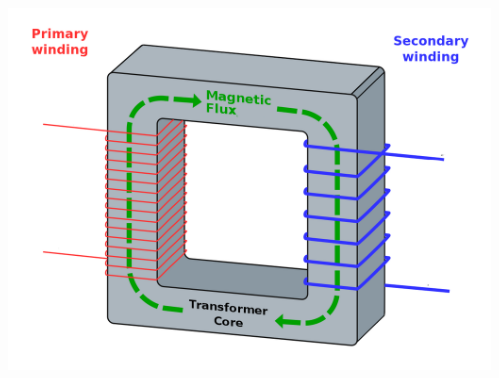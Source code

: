 \documentclass[unknownkeysallowed]{beamer}
\begin{document}
\begin{frame}
\begin{center}
\begin{minipage}{.9\textwidth}
\begin{columns}[T]
\begin{column}{.5\textwidth}
  \end{column}
    \begin{column}{.5\textwidth}
      \begin{block}{}\begin{center}
        \includegraphics[width=0.4\paperwidth]{figures/solidcore.png}
      \end{center}\end{block}
    \end{column}
  \end{columns}
  \end{minipage}\end{center}
\end{frame}
\end{document}
